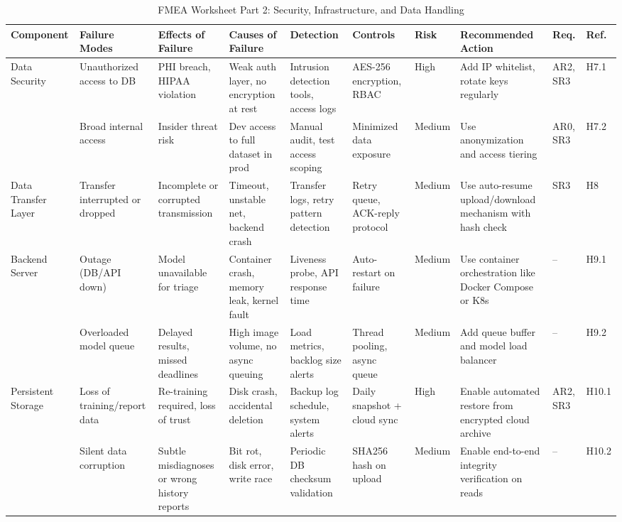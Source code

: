\documentclass{article}
\begin{document}
\begin{landscape}
\begin{table}[hp]
\caption{FMEA Worksheet Part 2: Security, Infrastructure, and Data Handling} \label{FMEA2}
\centering
\begin{footnotesize}
\begin{tabular}{@{}p{0.95in}p{1in}p{1.1in}p{1.5in}p{0.6in}p{0.9in}p{0.3in}p{1.9in}p{0.4in}p{0.4in}@{}}
\toprule
\textbf{Component} & \textbf{Failure Modes} & \textbf{Effects of Failure} & \textbf{Causes of Failure} & \textbf{Detection} & \textbf{Controls} & \textbf{Risk} & \textbf{Recommended Action} & \textbf{Req.} & \textbf{Ref.} \\
\midrule
\multirow{2}{*}{Data Security} & Unauthorized access to DB & PHI breach, HIPAA violation & Weak auth layer, no encryption at rest & Intrusion detection tools, access logs & AES-256 encryption, RBAC & High & Add IP whitelist, rotate keys regularly & AR2, SR3 & H7.1 \\
\cmidrule(lr){2-10}
& Broad internal access & Insider threat risk & Dev access to full dataset in prod & Manual audit, test access scoping & Minimized data exposure & Medium & Use anonymization and access tiering & AR0, SR3 & H7.2 \\
\midrule
Data Transfer Layer & Transfer interrupted or dropped & Incomplete or corrupted transmission & Timeout, unstable net, backend crash & Transfer logs, retry pattern detection & Retry queue, ACK-reply protocol & Medium & Use auto-resume upload/download mechanism with hash check & SR3 & H8 \\
\midrule
\multirow{2}{*}{Backend Server} & Outage (DB/API down) & Model unavailable for triage & Container crash, memory leak, kernel fault & Liveness probe, API response time & Auto-restart on failure & Medium & Use container orchestration like Docker Compose or K8s & -- & H9.1 \\
\cmidrule(lr){2-10}
& Overloaded model queue & Delayed results, missed deadlines & High image volume, no async queuing & Load metrics, backlog size alerts & Thread pooling, async queue & Medium & Add queue buffer and model load balancer & -- & H9.2 \\
\midrule
\multirow{2}{*}{Persistent Storage} & Loss of training/report data & Re-training required, loss of trust & Disk crash, accidental deletion & Backup log schedule, system alerts & Daily snapshot + cloud sync & High & Enable automated restore from encrypted cloud archive & AR2, SR3 & H10.1 \\
\cmidrule(lr){2-10}
& Silent data corruption & Subtle misdiagnoses or wrong history reports & Bit rot, disk error, write race & Periodic DB checksum validation & SHA256 hash on upload & Medium & Enable end-to-end integrity verification on reads & -- & H10.2 \\
\bottomrule
\end{tabular}
\end{footnotesize}
\end{table}
\end{landscape}
\restoregeometry
\end{document}
